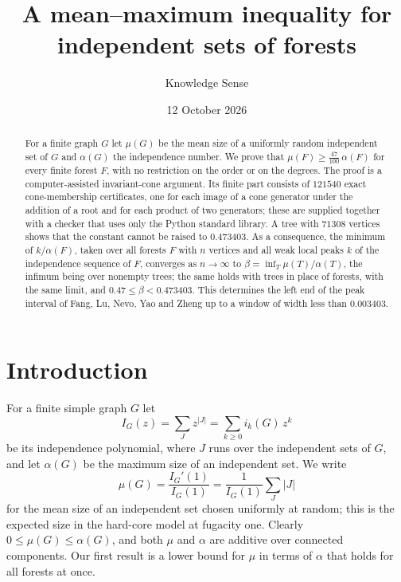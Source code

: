 \documentclass{amsart}
\numberwithin{equation}{section}
\theoremstyle{plain}
\theoremstyle{definition}
\theoremstyle{remark}
\begin{document}
\title{A mean--maximum inequality for independent sets of forests}

\author{Knowledge Sense}
\date{12 October 2026}


\begin{abstract}
For a finite graph $G$ let $\mu(G)$ be the mean size of a uniformly random independent set of $G$ and $\alpha(G)$ the independence number. We prove that $\mu(F)\ge\frac{47}{100}\,\alpha(F)$ for every finite forest $F$, with no restriction on the order or on the degrees. The proof is a computer-assisted invariant-cone argument. Its finite part consists of $121540$ exact cone-membership certificates, one for each image of a cone generator under the addition of a root and for each product of two generators; these are supplied together with a checker that uses only the Python standard library. A tree with $71308$ vertices shows that the constant cannot be raised to $0.473403$. As a consequence, the minimum of $k/\alpha(F)$, taken over all forests $F$ with $n$ vertices and all weak local peaks $k$ of the independence sequence of $F$, converges as $n\to\infty$ to $\beta=\inf_T\mu(T)/\alpha(T)$, the infimum being over nonempty trees; the same holds with trees in place of forests, with the same limit, and $0.47\le\beta<0.473403$. This determines the left end of the peak interval of Fang, Lu, Nevo, Yao and Zheng up to a window of width less than $0.003403$.
\end{abstract}

\maketitle

\section{Introduction}

For a finite simple graph $G$ let
\[
I_G(z)=\sum_{J}z^{|J|}=\sum_{k\ge 0}i_k(G)\,z^k
\]
be its independence polynomial, where $J$ runs over the independent sets of $G$, and let $\alpha(G)$ be the maximum size of an independent set. We write
\[
\mu(G)=\frac{I_G'(1)}{I_G(1)}=\frac{1}{I_G(1)}\sum_J|J|
\]
for the mean size of an independent set chosen uniformly at random; this is the expected size in the hard-core model at fugacity one. Clearly $0\le\mu(G)\le\alpha(G)$, and both $\mu$ and $\alpha$ are additive over connected components. Our first result is a lower bound for $\mu$ in terms of $\alpha$ that holds for all forests at once.
\end{document}
